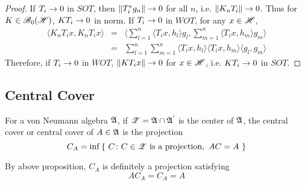 \documentclass[a4paper,11pt]{report}
\begin{document}
\begin{proof}
	If $T_i \rightarrow 0$ in $SOT$, then $\left\lVert T_i^{*} g_n\right\lVert \rightarrow 0$ for all $n$, i.e. $\left\lVert K_nT_i\right\lVert \rightarrow 0$. Thus for $K \in \mathscr{B}_{0}\mathscr{(H)}$, $KT_i \rightarrow 0$ in norm. If $T_i \rightarrow 0$ in $WOT$, for any $x \in \mathscr{H}$,
	\begin{eqnarray*}
		\langle K_n T_i x, K_n T_i x \rangle &=& \langle \sum_{l=1}^n \langle T_i x, h_l \rangle g_l, \sum_{m=1}^n \langle T_i x, h_m \rangle g_m \rangle \\
		&=& \sum_{l=1}^n \sum_{m=1}^n \langle T_i x, h_l \rangle \langle T_i x, h_m \rangle \langle g_l, g_m \rangle
	\end{eqnarray*}
	Therefore, if $T_i \rightarrow 0$ in $WOT$, $\left\lVert KT_i x\right\lVert \rightarrow 0$ for $x \in \mathscr{H}$, i.e. $KT_i \rightarrow 0$ in $SOT$.
\end{proof}

\subsection{Central Cover}

\begin{defn}
	For a von Neumann algebra $\mathfrak{A}$, if $\mathscr{Z} = \mathfrak{A} \cap \mathfrak{A}^{'}$ is the center of $\mathfrak{A}$, the central cover or central cover of $A \in \mathfrak{A}$ is the projection
	\begin{equation*}
		C_A = \inf{\{~C \colon C \in \mathscr{Z} \text{ is a projection},~AC = A~\}}
	\end{equation*}
\end{defn}
\begin{rem}
	By above proposition, $C_A$ is definitely a projection satisfying
	\begin{equation*}
		AC_A = C_A = A
	\end{equation*}
\end{rem}
\end{document}
